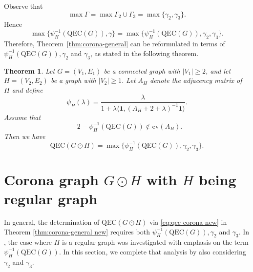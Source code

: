 \documentclass[pdflatex,sn-mathphys-num]{sn-jnl}
\theoremstyle{thmstyleone}%
\newtheorem{theorem}{Theorem}%
\theoremstyle{thmstyletwo}%
\theoremstyle{thmstylethree}%
\begin{document}
Observe that
\[\max \Gamma=\max \Gamma_2\cup \Gamma_3=\max \{\gamma_2,\gamma_3\}.\]
Hence
\[
\max\{\psi_{H}^{-1}(\mathrm{QEC}(G)),\gamma\}
=
\max\{\psi_{H}^{-1}(\mathrm{QEC}(G)),\gamma_2,\gamma_3\}.
\]
Therefore, Theorem~\ref{thm:corona-general} can be reformulated in terms of 
$\psi_H^{-1}(\mathrm{QEC}(G)), \gamma_2$ and $\gamma_3$, as stated in the following theorem.

\begin{theorem}\label{thm:corona-general  new}
Let $G=(V_1,E_1)$ be a connected graph with $|V_1|\ge 2$, 
and let $H=(V_2,E_2)$ be a graph with $|V_2|\ge 1$. 
Let $A_H$ denote the adjacency matrix of $H$ and define
\[
\psi_H(\lambda)
=
\frac{\lambda}{
1+\lambda \langle \mathbf{1}, (A_H+2+\lambda)^{-1}\mathbf{1}\rangle}.
\]
Assume that
\begin{equation}\label{eq:condition-spectrum  new}
-2-\psi_{H}^{-1}(\mathrm{QEC}(G))
\notin \mathrm{ev}(A_H).
\end{equation}
Then we have
\begin{equation}\label{eq:qec-corona new}
\mathrm{QEC}(G\odot H)
=
\max\{
\psi_{H}^{-1}(\mathrm{QEC}(G)),
\gamma_2,\gamma_3
\}.
\end{equation}
\end{theorem}


\section{Corona graph $G\odot H$ with $H$ being regular graph}

In general, the determination of $\mathrm{QEC}(G\odot H)$ via \eqref{eq:qec-corona new} in Theorem \ref{thm:corona-general new} requires both $\psi_H^{-1}(\mathrm{QEC}(G)), \gamma_2$ and $\gamma_3$. In \cite{Ferdi-Baskoro-Obata-Santika2025}, the case where $H$ is a regular graph was investigated with emphasis on the term $\psi_H^{-1}(\mathrm{QEC}(G))$. In this section, we complete that analysis by also considering $\gamma_2$ and $\gamma_3$.
\end{document}
